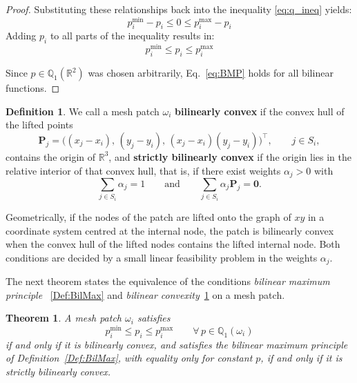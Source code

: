 \documentclass[a4paper]{article}
\theoremstyle{plain}
\newtheorem{theorem}[lemma]{Theorem}
\theoremstyle{definition}
\newtheorem{definition}[lemma]{Definition}
\theoremstyle{remark}
\begin{document}
\begin{proof}
Substituting these relationships back into the inequality \eqref{eq:q_ineq} yields:
$$
p_i^{\min} - p_i \leq 0 \leq p_i^{\max} - p_i
$$
Adding $p_i$ to all parts of the inequality results in:
$$
p_i^{\min} \leq p_i \leq p_i^{\max}
$$

Since $p \in \mathbb{Q}_1(\mathbb{R}^2)$ was chosen arbitrarily, Eq.~\eqref{eq:BMP} holds for all bilinear functions.
\end{proof}

\begin{definition}
We call a mesh patch $\omega_i$ \textbf{bilinearly convex} if the convex hull
of the lifted points
$$
\mathbf{P}_j = \bigl((x_j-x_i),\,(y_j-y_i),\,(x_j-x_i)(y_j-y_i)\bigr)^{\top},	\qquad j \in S_i,
$$
contains the origin of $\mathbb{R}^3$, and \textbf{strictly bilinearly convex} if the origin lies in the relative interior of that convex hull, that is, if there exist weights $\alpha_j > 0$ with
\begin{equation}\label{eq:convexrep}
\sum_{j \in S_i} \alpha_j = 1 	\qquad\text{and}\qquad 	\sum_{j \in S_i} \alpha_j \mathbf{P}_j = \mathbf{0}.	
\end{equation}
\label{Def:BilConv}
\end{definition}

Geometrically, if the nodes of the patch are lifted onto the graph of $xy$ in a
coordinate system centred at the internal node, the patch is bilinearly convex
when the convex hull of the lifted nodes contains the lifted internal node.
Both conditions are decided by a small linear feasibility problem in the weights
$\alpha_j$.
 
The next theorem states the equivalence of the conditions \emph{bilinear maximum principle}~ \ref{Def:BilMax} and \emph{bilinear convexity}~\ref{Def:BilConv} on a mesh patch.
 
\begin{theorem}
A mesh patch $\omega_i$ satisfies
\begin{equation*}
	p_i^{\min} \le p_i \le p_i^{\max} \qquad \forall\, p \in \mathbb{Q}_1(\omega_i)
\end{equation*}
if and only if it is bilinearly convex, and satisfies the bilinear maximum principle of Definition~\ref{Def:BilMax}, with equality only for constant $p$, 	if and only if it is strictly bilinearly convex.\label{thm:BMPiffBC}
\end{theorem}
\end{document}
